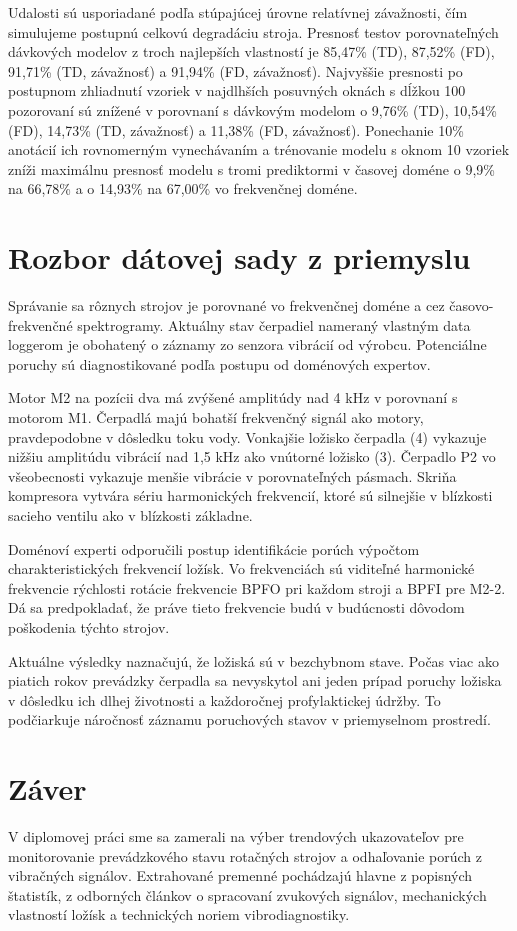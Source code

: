 Udalosti sú usporiadané podľa stúpajúcej úrovne relatívnej závažnosti, čím simulujeme postupnú celkovú degradáciu stroja. Presnosť testov porovnateľných dávkových modelov z troch najlepších vlastností je 85,47\% (TD), 87,52\% (FD), 91,71\% (TD, závažnosť) a 91,94\% (FD, závažnosť). Najvyššie presnosti po postupnom zhliadnutí vzoriek v najdlhších posuvných oknách s dĺžkou 100 pozorovaní sú znížené v porovnaní s dávkovým modelom o 9,76\% (TD), 10,54\% (FD), 14,73\% (TD, závažnosť) a 11,38\% (FD, závažnosť). Ponechanie 10\% anotácií ich rovnomerným vynechávaním a trénovanie modelu s oknom 10 vzoriek zníži maximálnu presnosť modelu s tromi prediktormi v časovej doméne o 9,9\% na 66,78\% a o 14,93\% na 67,00\% vo frekvenčnej doméne.

\section{Rozbor dátovej sady z priemyslu}
Správanie sa rôznych strojov je porovnané vo frekvenčnej doméne a cez časovo-frekvenčné spektrogramy. Aktuálny stav čerpadiel nameraný vlastným data loggerom je obohatený o záznamy zo senzora vibrácií od výrobcu. Potenciálne poruchy sú diagnostikované podľa postupu od doménových expertov. 

Motor M2 na pozícii dva má zvýšené amplitúdy nad 4 kHz v porovnaní s motorom M1. Čerpadlá majú bohatší frekvenčný signál ako motory, pravdepodobne v dôsledku toku vody. Vonkajšie ložisko čerpadla (4) vykazuje nižšiu amplitúdu vibrácií nad 1,5 kHz ako vnútorné ložisko (3). Čerpadlo P2 vo všeobecnosti vykazuje menšie vibrácie v porovnateľných pásmach. Skriňa kompresora vytvára sériu harmonických frekvencií, ktoré sú silnejšie v blízkosti sacieho ventilu ako v blízkosti základne.

Doménoví experti odporučili postup identifikácie porúch výpočtom charakteristických frekvencií ložísk. Vo frekvenciách sú viditeľné harmonické frekvencie rýchlosti rotácie frekvencie BPFO pri každom stroji a BPFI pre M2-2. Dá sa predpokladať, že práve tieto frekvencie budú v budúcnosti dôvodom poškodenia týchto strojov.

Aktuálne výsledky naznačujú, že ložiská sú v bezchybnom stave. Počas viac ako piatich rokov prevádzky čerpadla sa nevyskytol ani jeden prípad poruchy ložiska v dôsledku ich dlhej životnosti a každoročnej profylaktickej údržby. To podčiarkuje náročnosť záznamu poruchových stavov v priemyselnom prostredí. 

\section{Záver}
V diplomovej práci sme sa zamerali na výber trendových ukazovateľov pre monitorovanie prevádzkového stavu rotačných strojov a odhaľovanie porúch z vibračných signálov.  Extrahované premenné pochádzajú hlavne z popisných štatistík, z odborných článkov o spracovaní zvukových signálov, mechanických vlastností ložísk a technických noriem vibrodiagnostiky.

